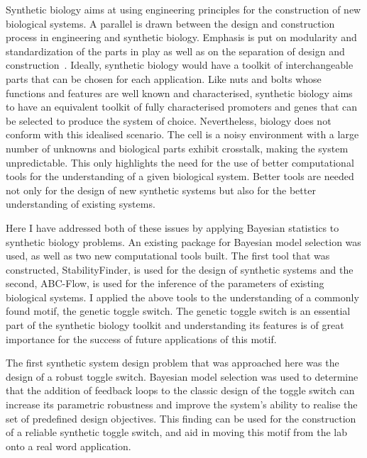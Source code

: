




Synthetic biology aims at using engineering principles for the construction of new biological systems. A parallel is drawn between the design and construction process in engineering and synthetic biology. Emphasis is put on modularity and standardization of the parts in play as well as on the separation of design and construction~\autocite{Agapakis:2009bt}. Ideally, synthetic biology would have a toolkit of interchangeable parts that can be chosen for each application. Like nuts and bolts whose functions and features are well known and characterised, synthetic biology aims to have an equivalent toolkit of fully characterised promoters and genes that can be selected to produce the system of choice. Nevertheless, biology does not conform with this idealised scenario. The cell is a noisy environment with a large number of unknowns and biological parts exhibit crosstalk, making the system unpredictable. This only highlights the need for the use of better computational tools for the understanding of a given biological system. Better tools are needed not only for the design of new synthetic systems but also for the better understanding of existing systems.     

Here I have addressed both of these issues by applying Bayesian statistics to synthetic biology problems. An existing package for Bayesian model selection was used, as well as two new computational tools built. The first tool that was constructed, StabilityFinder, is used for the design of synthetic systems and the second, ABC-Flow, is used for the inference of the parameters of existing biological systems. I applied the above tools to the understanding of a commonly found motif, the genetic toggle switch. The genetic toggle switch is an essential part of the synthetic biology toolkit and understanding its features is of great importance for the success of future applications of this motif. 

The first synthetic system design problem that was approached here was the design of a robust toggle switch. Bayesian model selection was used to determine that the addition of feedback loops to the classic design of the toggle switch can increase its parametric robustness and improve the system's ability to realise the set of predefined design objectives. This finding can be used for the construction of a reliable synthetic toggle switch, and aid in moving this motif from the lab onto a real word application.   

